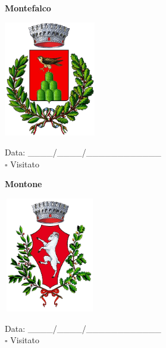 \documentclass[a5paper,12pt]{article}
\begin{document}
\vspace{0.7cm}

\noindent
\begin{minipage}[t]{0.45\textwidth}
    \begin{center}
        \textbf{Montefalco}
    \end{center}
    \vspace{-0.5cm} %
    \begin{center}
        \includegraphics[height= 5cm, width=4cm]{Umbria/Stemma Montefalco.png}
    \end{center}
    \vspace{-0.4cm} %
    \begin{flushleft}
        Data: \_\_\_\_/\_\_\_\_/\_\_\_\_\_\_\_\_\_\_\_\_ \\
        $\square$ Visitato
    \end{flushleft}
\end{minipage}
\hfill
\noindent
\begin{minipage}[t]{0.45\textwidth}
    \begin{center}
        \textbf{Montone}
    \end{center}
    \vspace{-0.5cm} %
    \begin{center}
        \includegraphics[height= 5cm, width=4cm]{Umbria/Stemma Montone.png}
    \end{center}
    \vspace{-0.4cm} %
    \begin{flushleft}
        Data: \_\_\_\_/\_\_\_\_/\_\_\_\_\_\_\_\_\_\_\_\_ \\
        $\square$ Visitato
    \end{flushleft}
\end{minipage}
\end{document}
